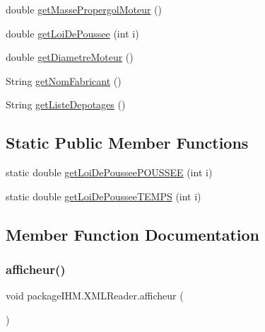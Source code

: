 \begin{DoxyCompactItemize}
\item 
double \mbox{\hyperlink{classpackage_i_h_m_1_1_x_m_l_reader_a147f1da5ea9ba4b08869b6227cdefcc1}{get\+Masse\+Propergol\+Moteur}} ()
\item 
double \mbox{\hyperlink{classpackage_i_h_m_1_1_x_m_l_reader_a2a5cd428a1d1fb7018093635c82ef2c0}{get\+Loi\+De\+Poussee}} (int i)
\item 
double \mbox{\hyperlink{classpackage_i_h_m_1_1_x_m_l_reader_a6dc2ef034a170d09cc4fcea919639392}{get\+Diametre\+Moteur}} ()
\item 
String \mbox{\hyperlink{classpackage_i_h_m_1_1_x_m_l_reader_ab5dbf5538d8c4a579c433d484360f61a}{get\+Nom\+Fabricant}} ()
\item 
String \mbox{\hyperlink{classpackage_i_h_m_1_1_x_m_l_reader_a767d4c4773c6973c6acbaf15f93ca320}{get\+Liste\+Depotages}} ()
\end{DoxyCompactItemize}
\subsection*{Static Public Member Functions}
\begin{DoxyCompactItemize}
\item 
static double \mbox{\hyperlink{classpackage_i_h_m_1_1_x_m_l_reader_ab14588c7051a567e4941a8ef17509994}{get\+Loi\+De\+Poussee\+P\+O\+U\+S\+S\+EE}} (int i)
\item 
static double \mbox{\hyperlink{classpackage_i_h_m_1_1_x_m_l_reader_ad4efb6130c44c8ef97f09d8e40a786a7}{get\+Loi\+De\+Poussee\+T\+E\+M\+PS}} (int i)
\end{DoxyCompactItemize}


\subsection{Member Function Documentation}
\mbox{\label{classpackage_i_h_m_1_1_x_m_l_reader_a30ae12374f7f3756f98903c447d5c447}} 
\subsubsection{\texorpdfstring{afficheur()}{afficheur()}}
{\footnotesize\ttfamily void package\+I\+H\+M.\+X\+M\+L\+Reader.\+afficheur (\begin{DoxyParamCaption}{ }\end{DoxyParamCaption})}

